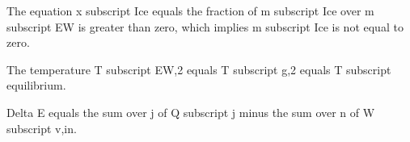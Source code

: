 The equation x subscript Ice equals the fraction of m subscript Ice over m subscript EW is greater than zero, which implies m subscript Ice is not equal to zero.

The temperature T subscript EW,2 equals T subscript g,2 equals T subscript equilibrium.

Delta E equals the sum over j of Q subscript j minus the sum over n of W subscript v,in.
